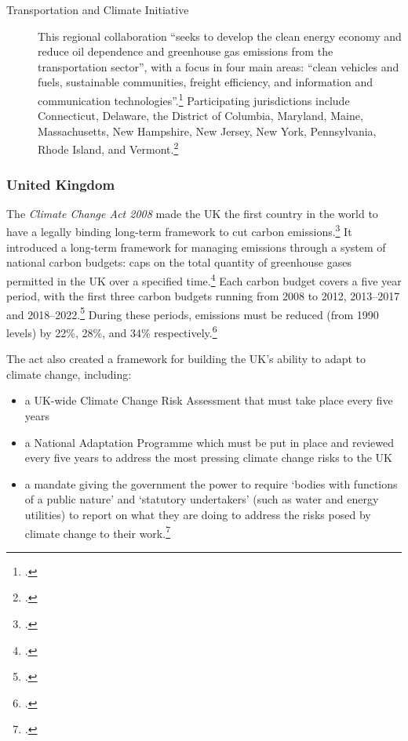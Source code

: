 \begin{description}
	\item[Transportation and Climate Initiative] This regional collaboration ``seeks to develop the clean energy economy and reduce oil dependence and greenhouse gas emissions from the transportation sector'', with a focus in four main areas: ``clean vehicles and fuels, sustainable communities, freight efficiency, and information and communication technologies''.\footcite[][]{TranspoClimate} Participating jurisdictions include Connecticut, Delaware, the District of Columbia, Maryland, Maine, Massachusetts, New Hampshire, New Jersey, New York, Pennsylvania, Rhode Island, and Vermont.\footcite[][]{GeorgetownOnTC}
\end{description}



	\subsubsection{United Kingdom}



The \emph{Climate Change Act 2008} made the UK the first country in the world to have a legally binding long-term framework to cut carbon emissions.\footcite[][]{ClimateConvention2009}
It introduced a long-term framework for managing emissions through a system of national carbon budgets: caps on the total quantity of greenhouse gases permitted in the UK over a specified time.\footcite[][]{ClimateConvention2009}
Each carbon budget covers a five year period, with the first three carbon budgets running from 2008 to 2012, 2013--2017 and 2018--2022.\footcite[][]{ClimateConvention2009}
During these periods, emissions must be reduced (from 1990 levels) by 22\%, 28\%, and 34\% respectively.\footcite[][]{ClimateConvention2009}



The act also created a framework for building the UK's ability to adapt to climate change, including:
\begin{itemize}
	\item a UK-wide Climate Change Risk Assessment that must take place every five years
	\item a National Adaptation Programme which must be put in place and reviewed every five years to address the most pressing climate change risks to the UK
	\item a mandate giving the government the power to require `bodies with functions of a public nature' and `statutory undertakers' (such as water and energy utilities) to report on what they are doing to address the risks posed by climate change to their work.\footcite[][]{ClimateConvention2009}
\end{itemize}


